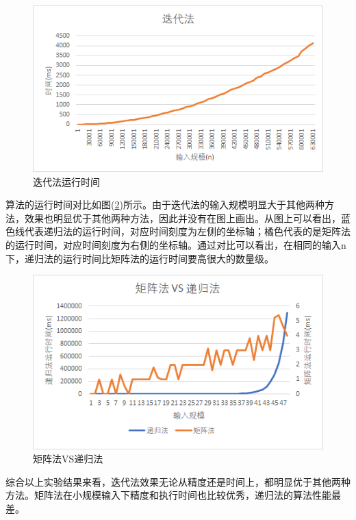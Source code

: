 \documentclass[UTF8]{ctexart}
\begin{document}
\begin{figure}[H]
    \centering
    \includegraphics[width=1\textwidth]{img/3.png}
    \caption{迭代法运行时间}
    \label{img3}
\end{figure}

算法的运行时间对比如图(\ref{img4})所示。由于迭代法的输入规模明显大于其他两种方法，效果也明显优于其他两种方法，因此并没有在图上画出。从图上可以看出，蓝色线代表递归法的运行时间，对应时间刻度为左侧的坐标轴；橘色代表的是矩阵法的运行时间，对应时间刻度为右侧的坐标轴。通过对比可以看出，在相同的输入n下，递归法的运行时间比矩阵法的运行时间要高很大的数量级。

\begin{figure}[H]
    \centering
    \includegraphics[width=1\textwidth]{img/4.png}
    \caption{矩阵法VS递归法}
    \label{img4}
\end{figure}

综合以上实验结果来看，迭代法效果无论从精度还是时间上，都明显优于其他两种方法。矩阵法在小规模输入下精度和执行时间也比较优秀，递归法的算法性能最差。

\end{document}
